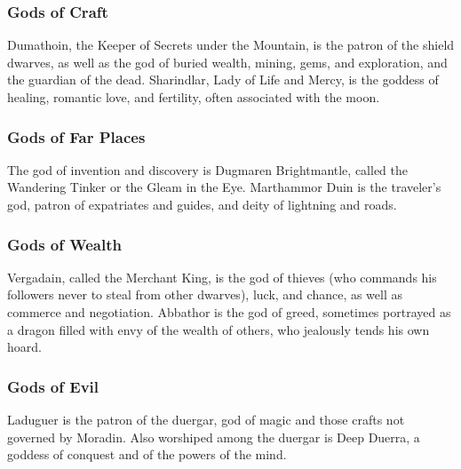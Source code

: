 \documentclass[10pt,a4paper,twoside,twocolumn,openany,bg=print,nodeprecatedcode]{dndbook}
\begin{document}
\subsubsection{Gods of Craft}
Dumathoin, the Keeper of Secrets under the Mountain, is the patron of the shield dwarves, as well as the god of buried wealth, mining, gems, and exploration, and the guardian of the dead. Sharindlar, Lady of Life and Mercy, is the goddess of healing, romantic love, and fertility, often associated with the moon.
\subsubsection{Gods of Far Places}
The god of invention and discovery is Dugmaren Brightmantle, called the Wandering Tinker or the Gleam in the Eye. Marthammor Duin is the traveler's god, patron of expatriates and guides, and deity of lightning and roads.
\subsubsection{Gods of Wealth}
Vergadain, called the Merchant King, is the god of thieves (who commands his followers never to steal from other dwarves), luck, and chance, as well as commerce and negotiation. Abbathor is the god of greed, sometimes portrayed as a dragon filled with envy of the wealth of others, who jealously tends his own hoard.
\subsubsection{Gods of Evil}
Laduguer is the patron of the duergar, god of magic and those crafts not governed by Moradin. Also worshiped among the duergar is Deep Duerra, a goddess of conquest and of the powers of the mind.
\end{document}
